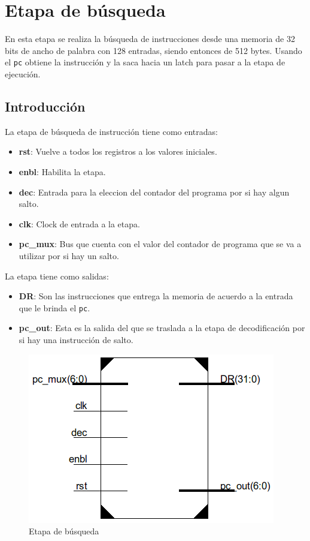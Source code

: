 \newpage
\section{Etapa de búsqueda}
En esta etapa se realiza la búsqueda de instrucciones desde una memoria de 32 bits de ancho de palabra con 128 entradas, siendo entonces de 512 bytes. Usando el  \texttt{pc} obtiene la instrucci\'on y la saca hacia un latch para pasar a la etapa de ejecución. 

\subsection{Introducción}
La etapa de b\'usqueda de instrucci\'on tiene como entradas:
\begin{itemize}
  \item \textbf{rst}: Vuelve a todos los registros a los valores iniciales. 
  \item \textbf{enbl}: Habilita la etapa.
  \item \textbf{dec}: Entrada para la eleccion del contador del programa por si hay algun salto.
  \item \textbf{clk}: Clock de entrada a la etapa.
  \item \textbf{pc\_mux}: Bus que cuenta con el valor del contador de programa que se va a utilizar por si hay un salto.
\end{itemize} 

La etapa tiene como salidas:
\begin{itemize}
	\item \textbf{DR}: Son las instrucciones que entrega la memoria de acuerdo a la entrada que le brinda el \texttt{pc}. 
	\item \textbf{pc\_out}: Esta es la salida del  que se traslada a la etapa de decodificaci\'on por si hay una instrucci\'on de salto. 
\end{itemize} 

\begin{figure}[H]
\centering
\includegraphics[scale=0.35]{Capitulo01/fetchstage}
\caption{Etapa de b\'usqueda}
\label{fig:fetch}
\end{figure}

